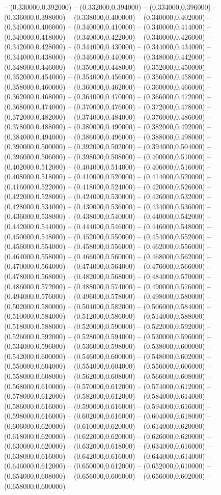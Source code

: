 -- (0.330000,0.392000) -- (0.332000,0.394000) -- (0.334000,0.396000) -- (0.336000,0.398000) -- (0.338000,0.400000) -- (0.340000,0.402000) -- (0.340000,0.406000) -- (0.340000,0.410000) -- (0.340000,0.414000) -- (0.340000,0.418000) -- (0.340000,0.422000) -- (0.340000,0.426000) -- (0.342000,0.428000) -- (0.344000,0.430000) -- (0.344000,0.434000) -- (0.344000,0.438000) -- (0.346000,0.440000) -- (0.348000,0.442000) -- (0.348000,0.446000) -- (0.350000,0.448000) -- (0.352000,0.450000) -- (0.352000,0.454000) -- (0.354000,0.456000) -- (0.356000,0.458000) -- (0.358000,0.460000) -- (0.360000,0.462000) -- (0.360000,0.466000) -- (0.362000,0.468000) -- (0.364000,0.470000) -- (0.366000,0.472000) -- (0.368000,0.474000) -- (0.370000,0.476000) -- (0.372000,0.478000) -- (0.372000,0.482000) -- (0.374000,0.484000) -- (0.376000,0.486000) -- (0.378000,0.488000) -- (0.380000,0.490000) -- (0.382000,0.492000) -- (0.384000,0.494000) -- (0.386000,0.496000) -- (0.388000,0.498000) -- (0.390000,0.500000) -- (0.392000,0.502000) -- (0.394000,0.504000) -- (0.396000,0.506000) -- (0.398000,0.508000) -- (0.400000,0.510000) -- (0.402000,0.512000) -- (0.404000,0.514000) -- (0.406000,0.516000) -- (0.408000,0.518000) -- (0.410000,0.520000) -- (0.414000,0.520000) -- (0.416000,0.522000) -- (0.418000,0.524000) -- (0.420000,0.526000) -- (0.422000,0.528000) -- (0.424000,0.530000) -- (0.426000,0.532000) -- (0.428000,0.534000) -- (0.430000,0.536000) -- (0.434000,0.536000) -- (0.436000,0.538000) -- (0.438000,0.540000) -- (0.440000,0.542000) -- (0.442000,0.544000) -- (0.444000,0.546000) -- (0.446000,0.548000) -- (0.450000,0.548000) -- (0.452000,0.550000) -- (0.454000,0.552000) -- (0.456000,0.554000) -- (0.458000,0.556000) -- (0.462000,0.556000) -- (0.464000,0.558000) -- (0.466000,0.560000) -- (0.468000,0.562000) -- (0.470000,0.564000) -- (0.474000,0.564000) -- (0.476000,0.566000) -- (0.478000,0.568000) -- (0.482000,0.568000) -- (0.484000,0.570000) -- (0.486000,0.572000) -- (0.488000,0.574000) -- (0.490000,0.576000) -- (0.494000,0.576000) -- (0.496000,0.578000) -- (0.498000,0.580000) -- (0.502000,0.580000) -- (0.504000,0.582000) -- (0.506000,0.584000) -- (0.510000,0.584000) -- (0.512000,0.586000) -- (0.514000,0.588000) -- (0.518000,0.588000) -- (0.520000,0.590000) -- (0.522000,0.592000) -- (0.526000,0.592000) -- (0.528000,0.594000) -- (0.530000,0.596000) -- (0.534000,0.596000) -- (0.536000,0.598000) -- (0.538000,0.600000) -- (0.542000,0.600000) -- (0.546000,0.600000) -- (0.548000,0.602000) -- (0.550000,0.604000) -- (0.554000,0.604000) -- (0.556000,0.606000) -- (0.558000,0.608000) -- (0.562000,0.608000) -- (0.566000,0.608000) -- (0.568000,0.610000) -- (0.570000,0.612000) -- (0.574000,0.612000) -- (0.578000,0.612000) -- (0.582000,0.612000) -- (0.584000,0.614000) -- (0.586000,0.616000) -- (0.590000,0.616000) -- (0.594000,0.616000) -- (0.598000,0.616000) -- (0.602000,0.616000) -- (0.604000,0.618000) -- (0.606000,0.620000) -- (0.610000,0.620000) -- (0.614000,0.620000) -- (0.618000,0.620000) -- (0.622000,0.620000) -- (0.626000,0.620000) -- (0.630000,0.620000) -- (0.632000,0.618000) -- (0.634000,0.616000) -- (0.638000,0.616000) -- (0.642000,0.616000) -- (0.644000,0.614000) -- (0.646000,0.612000) -- (0.650000,0.612000) -- (0.652000,0.610000) -- (0.654000,0.608000) -- (0.656000,0.606000) -- (0.656000,0.602000) -- (0.658000,0.600000) 